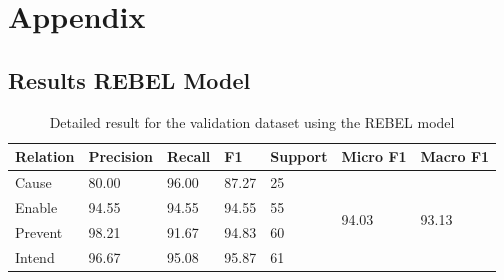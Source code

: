 \documentclass[
hf, %
]{ceurart}
\begin{document}






\pagebreak


\appendix

\section{Appendix}
\label{sec:appendix}

\subsection{Results REBEL Model}
\begin{table}[!h]
\centering
\begin{tabular}{|l|l|l|l|l|l|l|}
\hline
\textbf{Relation} & \textbf{Precision} & \textbf{Recall} & \textbf{F1} & \textbf{Support} & \textbf{Micro F1}      & \textbf{Macro F1}      \\ \hline
Cause             & 80.00              & 96.00           & 87.27       & 25               & \multirow{4}{*}{94.03} & \multirow{4}{*}{93.13} \\ \cline{1-5}
Enable            & 94.55              & 94.55           & 94.55       & 55               &                        &                        \\ \cline{1-5}
Prevent           & 98.21              & 91.67           & 94.83       & 60               &                        &                        \\ \cline{1-5}
Intend            & 96.67              & 95.08           & 95.87       & 61               &                        &                        \\ \hline
\end{tabular}
\caption{Detailed result for the validation dataset using the REBEL model}
\label{apx:val_result_rebel}
\end{table}
\end{document}
